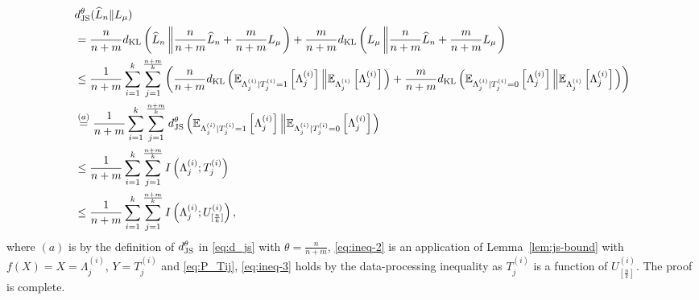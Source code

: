 \documentclass[onecolumn,romanappendices,10pt]{IEEEtran}
\newcommand{\EE}{{\mathbb{E}}}
\begin{document}
	\begin{subequations}
		\begin{align}
			&d^\theta_{\textnormal{JS}} (\widehat{L}_n \| L_\mu) \nonumber \\
			&= \frac{n}{n+m} d_{\textnormal{KL}} \left(\widehat{L}_n \left\| \frac{n}{n+m} \widehat{L}_n + \frac{m}{n+m} L_\mu \right.\right) + \frac{m}{n+m} d_{\textnormal{KL}} \left(L_\mu \left\| \frac{n}{n+m} \widehat{L}_n + \frac{m}{n+m} L_\mu \right.\right) \nonumber \\
			&\leq \frac{1}{n+m} \sum_{i=1}^k \sum_{j=1}^{\frac{n+m}{k}} \left( \frac{n}{n+m} d_{\textnormal{KL}} \left(\EE_{\Lambda^{(i)}_j | T^{(i)}_j = 1} \left[ \Lambda^{(i)}_j \right] \left\| \EE_{\Lambda^{(i)}_j} \left[ \Lambda^{(i)}_j \right] \right.\right) +  \frac{m}{n+m} d_{\textnormal{KL}} \left(\EE_{\Lambda^{(i)}_j | T^{(i)}_j = 0} \left[ \Lambda^{(i)}_j \right] \left\| \EE_{\Lambda^{(i)}_j} \left[ \Lambda^{(i)}_j \right] \right.\right) \right) \label{eq:ineq-1} \\
			&\overset{(a)}{=} \frac{1}{n+m} \sum_{i=1}^k \sum_{j=1}^{\frac{n+m}{k}} d_{\textnormal{JS}}^\theta \left(\EE_{\Lambda^{(i)}_j | T^{(i)}_j = 1} \left[ \Lambda^{(i)}_j \right] \left\| \EE_{\Lambda^{(i)}_j | T^{(i)}_j = 0} \left[ \Lambda^{(i)}_j \right] \right.\right) \nonumber \\
			&\leq \frac{1}{n+m} \sum_{i=1}^k \sum_{j=1}^{\frac{n+m}{k}} I \left( \Lambda^{(i)}_j; T^{(i)}_j \right) \label{eq:ineq-2} \\
			&\leq \frac{1}{n+m} \sum_{i=1}^k \sum_{j=1}^{\frac{n+m}{k}} I \left( \Lambda^{(i)}_j; U^{(i)}_{[\frac{n}{k}]} \right), \label{eq:ineq-3}
		\end{align}
	\end{subequations}
	where $(a)$ is by the definition of $d_{\textnormal{JS}}^\theta$ in \eqref{eq:d_js} with $\theta = \frac{n}{n+m}$, \eqref{eq:ineq-2} is an application of Lemma~\ref{lem:js-bound} with $f(X) = X = \Lambda^{(i)}_j$, $Y = T^{(i)}_j$ and \eqref{eq:P_Tij}, \eqref{eq:ineq-3} holds by the data-processing inequality as $T^{(i)}_j$ is a function of $U^{(i)}_{[\frac{n}{k}]}$. The proof is complete.
	
\end{document}
